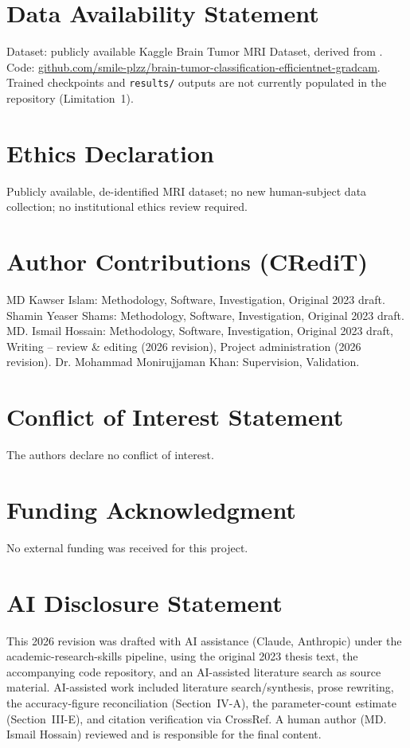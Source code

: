 \documentclass[journal]{IEEEtran}
\begin{document}
\section*{Data Availability Statement}
Dataset: publicly available Kaggle Brain Tumor MRI Dataset, derived from \cite{ref18}. Code: \url{github.com/smile-plzz/brain-tumor-classification-efficientnet-gradcam}. Trained checkpoints and \texttt{results/} outputs are not currently populated in the repository (Limitation~1).

\section*{Ethics Declaration}
Publicly available, de-identified MRI dataset; no new human-subject data collection; no institutional ethics review required.

\section*{Author Contributions (CRediT)}
MD Kawser Islam: Methodology, Software, Investigation, Original 2023 draft. Shamin Yeaser Shams: Methodology, Software, Investigation, Original 2023 draft. MD. Ismail Hossain: Methodology, Software, Investigation, Original 2023 draft, Writing -- review \& editing (2026 revision), Project administration (2026 revision). Dr. Mohammad Monirujjaman Khan: Supervision, Validation.

\section*{Conflict of Interest Statement}
The authors declare no conflict of interest.

\section*{Funding Acknowledgment}
No external funding was received for this project.

\section*{AI Disclosure Statement}
This 2026 revision was drafted with AI assistance (Claude, Anthropic) under the academic-research-skills pipeline, using the original 2023 thesis text, the accompanying code repository, and an AI-assisted literature search as source material. AI-assisted work included literature search/synthesis, prose rewriting, the accuracy-figure reconciliation (Section~IV-A), the parameter-count estimate (Section~III-E), and citation verification via CrossRef. A human author (MD. Ismail Hossain) reviewed and is responsible for the final content.
\end{document}
